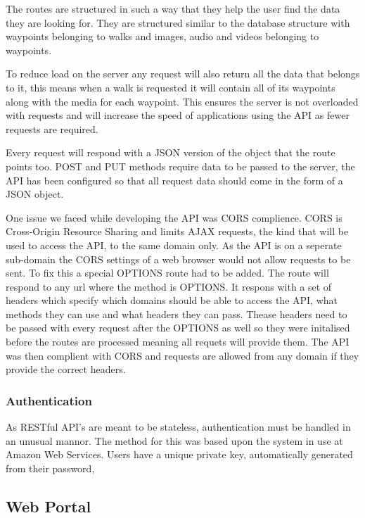 \documentclass[11pt,a4paper]{article}
\begin{document}
The routes are structured in such a way that they help the user find the data they are looking for. They are structured similar to the database structure with waypoints belonging to walks and images, audio and videos belonging to waypoints. 

To reduce load on the server any request will also return all the data that belongs to it, this means when a walk is requested it will contain all of its waypoints along with the media for each waypoint. This ensures the server is not overloaded with requests and will increase the speed of applications using the API as fewer requests are required.

Every request will respond with a JSON version of the object that the route points too. POST and PUT methods require data to be passed to the server, the API has been configured so that all request data should come in the form of a JSON object. 

One issue we faced while developing the API was CORS complience. CORS is Cross-Origin Resource Sharing and limits AJAX requests, the kind that will be used to access the API, to the same domain only. As the API is on a seperate sub-domain the CORS settings of a web browser would not allow requests to be sent. To fix this a special OPTIONS route had to be added. The route will respond to any url where the method is OPTIONS. It respons with a set of headers which specify which domains should be able to access the API, what methods they can use and what headers they can pass. Thease headers need to be passed with every request after the OPTIONS as well so they were initalised before the routes are processed meaning all requets will provide them. The API was then complient with CORS and requests are allowed from any domain if they provide the correct headers. 

\subsubsection{Authentication}

As RESTful API's are meant to be stateless, authentication must be handled in an unusual mannor. The method for this was based upon the system in use at Amazon Web Services\cite{auth}. Users have a unique private key, automatically generated from their password, 


\subsection{Web Portal}
\end{document}
